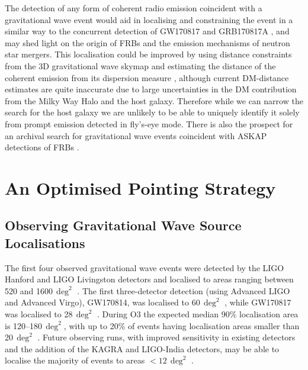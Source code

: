 The detection of any form of coherent radio emission coincident with a gravitational wave event would aid in localising and constraining the event in a similar way to the concurrent detection of GW170817 and GRB170817A \citep{2017ApJ...848L..13A}, and may shed light on the origin of FRBs and the emission mechanisms of neutron star mergers. This localisation could be improved by using distance constraints from the 3D gravitational wave skymap and estimating the distance of the coherent emission from its dispersion measure \citep[DM;][]{2003ApJ...598L..79I,2004MNRAS.348..999I}, although current DM-distance estimates are quite inaccurate due to large uncertainties in the DM contribution from the Milky Way Halo \citep{2015MNRAS.451.4277D} and the host galaxy. Therefore while we can narrow the search for the host galaxy we are unlikely to be able to uniquely identify it solely from prompt emission detected in fly's-eye mode. There is also the prospect for an archival search for gravitational wave events coincident with ASKAP detections of FRBs \citep{2016PhRvD..93l2008A}.

\section{An Optimised Pointing Strategy}
\vspace{-5pt}
\subsection{Observing Gravitational Wave Source Localisations}
\label{sec:observing_regions}
The first four observed gravitational wave events were detected by the LIGO Hanford and LIGO Livingston detectors and localised to areas ranging between 520 and 1600\,$\deg^2$ \citep{2017PhRvL.118v1101A,2017ApJ...851L..35A}. The first three-detector detection (using Advanced LIGO and Advanced Virgo), GW170814, was localised to 60\,$\deg^2$ \citep{2017PhRvL.119n1101A}, while GW170817 was localised to 28\,$\deg^2$ \citep{2017PhRvL.119p1101A}. During O3 the expected median 90\% localisation area is 120--180\,$\deg^2$, with up to 20\% of events having localisation areas smaller than 20\,$\deg^2$ \citep{2018LRR....21....3A}. Future observing runs, with improved sensitivity in existing detectors and the addition of the KAGRA and LIGO-India detectors, may be able to localise the majority of events to areas ${<12\,\deg^2}$ \citep{2018LRR....21....3A}.

